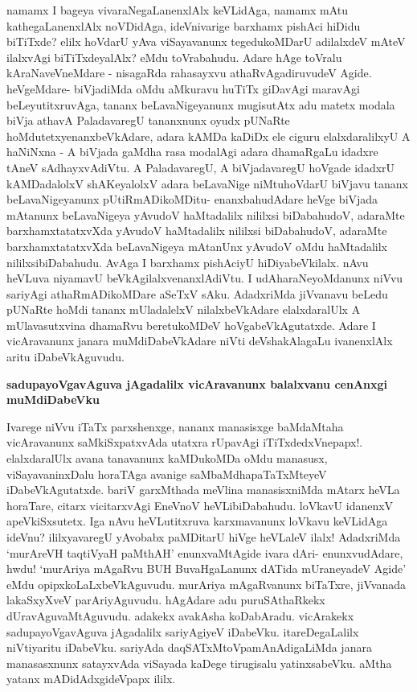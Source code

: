 \noindent
namamx I bageya vivaraNegaLanenxlAlx keVLidAga, namamx mAtu kathegaLanenxlAlx noVDi\-dAga, ideVniva\-rige barxhamx pishAci hiDidu biTiTxde? elilx hoVdarU yAva viSaya\-vanunx tegedukoMDarU adi\-lalxdeV mAteV ilalxvAgi biTiTxdeyalAlx? eMdu toVra\-bahudu. Adare hAge toVralu kAraNaveVneMdare - nisagaRda raha\-sayxvu athaR\-vAgadiruvudeV Agide. heVgeMdare- biVjadiMda oMdu aMkuravu huTiTx giDavAgi mara\-vAgi beLeyutitxruvAga, tananx beLavaNigeyanunx mugisutAtx adu matetx modala biVja athavA Palada\-varegU tananxnunx oyudx pUNaRte hoMdutetxyenanxbeVkAdare, adara kAMDa kaDiDx ele ciguru elalxda\-ralilxyU A haNiNxna - A biVjada gaMdha rasa modalAgi adara dhamaRgaLu idadxre tAneV sAdhayxvAdiVtu. A PaladavaregU, A biVjadavaregU hoVgade idadxrU kAMDadalolxV shAKeyalolxV adara beLa\-vaNige niMtuhoVdarU biVjavu tananx beLavaNigeyanunx pUtiRmADikoMDitu- enanxbahudAdare heVge biVjada mAtanunx beLavaNigeya yAvudoV haMtadalilx nililxsi biDa\-bahudoV, adaraMte barxhamxtatatxvXda yAvudoV haMtadalilx nililxsi biDabahudoV, adaraMte barxhamxtatatxvXda beLavaNigeya mAtanUnx yAvudoV oMdu haMtadalilx nililxsibiDabahudu. AvAga I barxhamx pishAciyU hiDiyabeVkilalx. nAvu heVLuva niya\-mavU beVkAgilalxvenanxlAdiVtu. I udAharaNeyoMdanunx niVvu sariyAgi athaRmADikoMDare aSeTxV sAku. AdadxriMda jiVvanavu beLedu pUNaRte hoMdi tananx mUladalelxV nilalxbeVkAdare elalxdaralUlx A mUla\-vasutxvina dhamaRvu beretukoMDeV hoVgabeVkAgutatxde. Adare I vicAravanunx janara muMdiDabeVkAdare niVti deVshakAlagaLu ivanenxlAlx aritu iDabeVkAguvudu.

{\bigskip
\noindent
{\large\bf sadupayoVgavAguva jAgadalilx vicAravanunx balalxvanu cenAnxgi muMdiDa\break\-beVku}}\label{page248}
\medskip

\noindent
Ivarege niVvu iTaTx parxshenxge, nananx manasisxge baMdaMtaha vicAravanunx saMkiSxpatxvAda utatxra rUpavAgi iTiTxdedxVnepapx!. elalxdaralUlx avana tanavanunx kaMDukoMDa oMdu manasusx, viSayavaninxDalu horaTAga avanige saMbaMdhapaTaTxMteyeV iDabeVkAgutatxde. bariV garxMthada meVlina manasisxniMda mAtarx heVLa hora\-Tare, citarx vicitarxvAgi EneVnoV heVLibiDabahudu. loVkavU idanenxV apeVkiSxsutetx. Iga nAvu heVLu\-titxruva karxmavanunx loVkavu keVLidAga ideVnu? ililxyavaregU yAvobabx paMDitarU hiVge heVLaleV ilalx! AdadxriMda `murAreVH taqtiVyaH paMthAH'\label{248} enunxvaMtAgide ivara dAri- enunxvudAdare, hwdu! `murAriya mAgaRvu BUH BuvaHgaLanunx dATida mUraneyadeV Agide' eMdu opipxkoLaLxbeVkAgu\-vudu. murAriya mAgaRvanunx biTaTxre, jiVvanada lakaSxyXveV parAriyAguvudu. hAgAdare adu puru\-SAthaRkekx dUravAguvaMtAguvudu. adakekx avakAsha koDabAradu. vicArakekx sadupayoVgavAguva jAgadalilx sariyAgiyeV iDabeVku. itareDegaLalilx niVtiyaritu iDabeVku. sariyAda daqSATxMtoVpa\-mAnAdigaLiMda janara manasasxnunx satayxvAda viSayada kaDege tirugisalu yatinxsabeVku. aMtha yatanx mADidAdxgideVpapx ililx.

